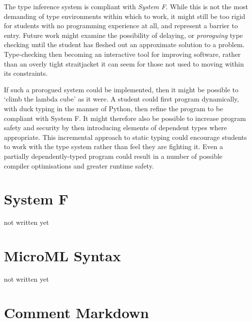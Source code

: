 \documentclass[12pt, a4paper]{report}
\begin{document}
The type inference system is compliant with \textit{System F}. While this is not the most demanding
of type environments within which to work, it might still be too rigid for students with no
programming experience at all, and represent a barrier to entry. Future work might examine the
possibility of delaying, or \textit{proroguing} type checking until the student has fleshed out an
approximate solution to a problem\cite{Afshari:2012:LPP:2384592.2384595}. Type-checking then
becoming an interactive tool for improving software, rather than an overly tight straitjacket it can
seem for those not used to moving within its constraints.

If such a prorogued system could be implemented, then it might be possible to `climb the lambda
cube' as it were. A student could first program dynamically, with duck typing in the manner of
Python, then refine the program to be compliant with System F. It might therefore also be possible
to increase program safety and security by then introducing elements of dependent types where
appropriate. This incremental approach to static typing could encourage students to work with the
type system rather than feel they are fighting it. Even a partially dependently-typed program could
result in a number of possible compiler optimisations and greater runtime safety.

\begin{appendices}
    \chapter{System F}
    \label{appendix:sysf}
    not written yet
    \chapter{MicroML Syntax}
    \label{appendix:syntax}
    not written yet
    \chapter{Comment Markdown}
    \label{appendix:md}
    
\end{appendices}

\nocite{adams2012layout}
\nocite{groote}
\nocite{9780511608865}

{}

\end{document}
